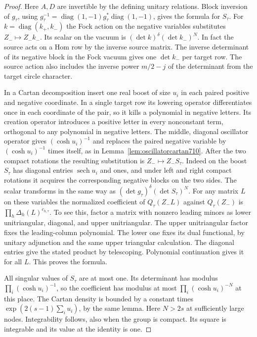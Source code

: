\documentclass[a4paper,11pt]{article}
\theoremstyle{definition}
\theoremstyle{remark}
\numberwithin{equation}{section}
\begin{document}
\begin{proof}
Here \(A,D\) are invertible by the defining unitary relations.
Block inversion of \(g_\tau\), using
\(g_\tau^{-1}=\operatorname{diag}(1,-1)g_\tau^*
\operatorname{diag}(1,-1)\), gives the formula for \(S_\tau\).
For \(k=\operatorname{diag}(k_+,k_-)\) the Fock action on the
negative variables substitutes \(Z_-\mapsto Z_- k_-\). Its
scalar on the vacuum is \((\det k)^\delta(\det k_-)^N\).
In fact the source acts on a Hom row by the inverse source
matrix. The inverse determinant of its negative block in the
Fock vacuum gives one \(\det k_-\) per target row. The source
action also includes the inverse power \(m/2-j\) of the
determinant from the target circle character.

In a Cartan decomposition insert one real boost of size \(u_i\)
in each paired positive and negative coordinate. In a single
target row its lowering operator differentiates once in each
coordinate of the pair, so it kills a polynomial in negative
letters. Its creation operator introduces a positive letter
in every nonconstant term, orthogonal to any polynomial in
negative letters. The middle, diagonal oscillator operator
gives \((\cosh u_i)^{-1}\) and replaces the paired negative
variable by \((\cosh u_i)^{-1}\) times itself, as in
Lemma~\ref{lem:oscillatorcartan710}. After the two compact
rotations the resulting substitution is \(Z_-\mapsto Z_- S_\tau\).
Indeed on the boost \(S_\tau\) has diagonal entries \(\operatorname{sech}
u_i\) and ones, and under left and right compact rotations it
acquires the corresponding negative blocks on the two sides.
The scalar transforms in the same way as
\((\det g_\tau)^\delta(\det S_\tau)^N\).
For any matrix \(L\) on these variables the normalized
coefficient of \(Q_\tau(Z_- L)\) against \(Q_\tau(Z_-)\) is
\(\prod_h\Delta_h(L)^{c_{h,\tau}}\). To see this, factor a
matrix with nonzero leading minors as lower unitriangular,
diagonal, and upper unitriangular. The upper unitriangular
factor fixes the leading-column polynomial. The lower one
fixes its dual functional, by unitary adjunction and the same
upper triangular calculation. The diagonal entries give the
stated product by telescoping. Polynomial continuation gives
it for all \(L\). This proves the formula.

All singular values of \(S_\tau\) are at most one. Its
determinant has modulus \(\prod_i(\cosh u_i)^{-1}\), so the
coefficient has modulus at most \(\prod_i(\cosh u_i)^{-N}\)
at this place. The Cartan density is bounded by a constant
times \(\exp(2(s-1)\sum_i u_i)\), by the same lemma.
Here \(N>2s\) at sufficiently large nodes. Integrability
follows, also when the group is compact. Its square is
integrable and its value at the identity is one.


\end{proof}
\end{document}
